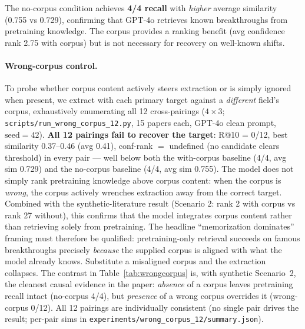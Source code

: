 \documentclass[11pt]{article}
\newcommand{\fpath}[1]{\mbox{}\nolinkurl{#1}}
\begin{document}
The no-corpus condition achieves \textbf{4/4 recall} with \emph{higher} average similarity (0.755 vs 0.729), confirming that GPT-4o retrieves known breakthroughs from pretraining knowledge. The corpus provides a ranking benefit (avg confidence rank 2.75 with corpus) but is not necessary for recovery on well-known shifts.

\paragraph{Wrong-corpus control.}
To probe whether corpus content actively steers extraction or is simply ignored when present, we extract with each primary target against a \emph{different} field's corpus, exhaustively enumerating all 12 cross-pairings ($4 \times 3$; \texttt{scripts/run\_wrong\_corpus\_12.py}, 15 papers each, GPT-4o clean prompt, $\text{seed}{=}42$). \textbf{All 12 pairings fail to recover the target}: R@10 = 0/12, best similarity 0.37--0.46 (avg 0.41), conf-rank $=$ undefined (no candidate clears threshold) in every pair --- well below both the with-corpus baseline (4/4, avg sim 0.729) and the no-corpus baseline (4/4, avg sim 0.755). The model does not simply rank pretraining knowledge above corpus content: when the corpus is \emph{wrong}, the corpus actively wrenches extraction away from the correct target. Combined with the synthetic-literature result (Scenario 2: rank 2 with corpus vs rank 27 without), this confirms that the model integrates corpus content rather than retrieving solely from pretraining. The headline ``memorization dominates'' framing must therefore be qualified: pretraining-only retrieval succeeds on famous breakthroughs precisely \emph{because} the supplied corpus is aligned with what the model already knows. Substitute a misaligned corpus and the extraction collapses. The contrast in Table~\ref{tab:wrongcorpus} is, with synthetic Scenario~2, the cleanest causal evidence in the paper: \emph{absence} of a corpus leaves pretraining recall intact (no-corpus 4/4), but \emph{presence} of a wrong corpus overrides it (wrong-corpus 0/12). All 12 pairings are individually consistent (no single pair drives the result; per-pair sims in \fpath{experiments/wrong_corpus_12/summary.json}).
\end{document}
